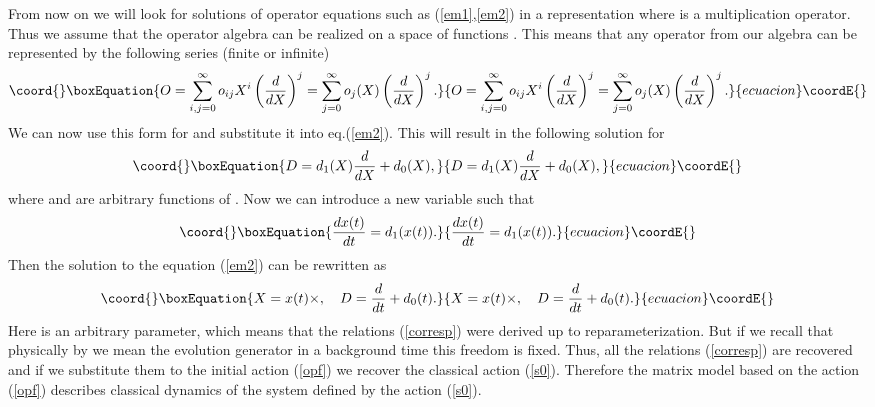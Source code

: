 \documentclass[a4paper,11pt]{article}
\begin{document}
From now on we will look for solutions of operator equations such
as (\ref{em1},\ref{em2}) in a representation where \coordHE{} is a
multiplication operator. Thus we assume that the operator algebra
can be realized on a space of functions \coordHE{}. This means that
any operator from our algebra can be represented by the following
series (finite or infinite)
\begin{equation}\coord{}\boxEquation{
O=\sum\limits_{i,j=0}^{\infty}o_{ij}X^i \left(
\frac{d}{dX}\right)^j=
\sum\limits_{j=0}^{\infty}o_{j}(X)\left(\frac{d}{dX}\right)^j.
\label{patt}
}{
O=\sum\limits_{i,j=0}^{\infty}o_{ij}X^i \left(
\frac{d}{dX}\right)^j=
\sum\limits_{j=0}^{\infty}o_{j}(X)\left(\frac{d}{dX}\right)^j.
}{ecuacion}\coordE{}\end{equation}
We can now use this form for \coordHE{} and substitute it into
eq.(\ref{em2}). This will result in the following solution for \coordHE{}
\begin{equation}\coord{}\boxEquation{
D=d_1(X)\frac{d}{dX}+d_0(X), \label{solfod}
}{
D=d_1(X)\frac{d}{dX}+d_0(X), }{ecuacion}\coordE{}\end{equation}
where \coordHE{} and \coordHE{} are arbitrary functions of \coordHE{}. Now we
can  introduce a new variable \coordHE{} such that
\begin{equation}\coord{}\boxEquation{
\frac{dx(t)}{dt}=d_1(x(t)). \label{proof5}
}{
\frac{dx(t)}{dt}=d_1(x(t)). }{ecuacion}\coordE{}\end{equation}
Then  the solution to the equation (\ref{em2}) can be rewritten as
\begin{equation}\coord{}\boxEquation{
X=x(t)\times, \ \ \ D= \frac{d}{dt} +d_0(t). \label{prooff}
}{
X=x(t)\times, \ \ \ D= \frac{d}{dt} +d_0(t). }{ecuacion}\coordE{}\end{equation}
Here \coordHE{} is an arbitrary parameter, which means that the relations
(\ref{corresp}) were derived up to reparameterization. But if we
recall that physically by \coordHE{} we mean the evolution generator in a
background time this freedom is fixed. Thus, all the relations
(\ref{corresp}) are recovered  and if we substitute them to the
initial action (\ref{opf}) we recover the classical action
(\ref{s0}). Therefore the matrix model based on the action
(\ref{opf}) describes classical dynamics of the system defined by
the action (\ref{s0}).
\end{document}
